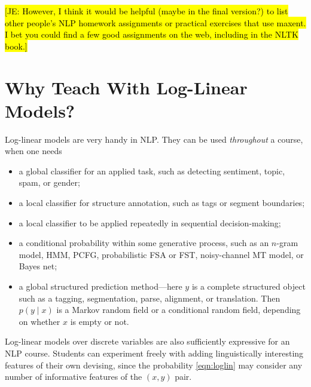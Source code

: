 \documentclass[11pt,letterpaper]{article}
\newcommand{\Note}[1]{}
\renewcommand{\Note}[1]{\hl{[#1]}}  %
\newcommand{\NoteSigned}[3]{{\sethlcolor{#2}\Note{#1: #3}}}
\newcommand{\NoteJE}[1]{\NoteSigned{JE}{LightGreen}{#1}}
\newcommand{\Commented}[1]{#1}
\begin{document}
\Commented{\NoteJE{However, I
  think it would be helpful (maybe in the final version?) to list
  other people's NLP homework assignments or practical exercises that
  use maxent.  I bet you could find a few good assignments on the web,
  including in the NLTK book.}}

\section{Why Teach With Log-Linear Models?}

Log-linear models are very handy in NLP.  They can be used {\em throughout} 
a course, when one needs 
\begin{itemize}
\item a global classifier for an applied task, such as detecting
  sentiment, topic, spam, or gender;
\item a local classifier for structure annotation,
  such as tags or segment boundaries;
\item a local classifier to be applied repeatedly in sequential decision-making;
\item a conditional probability within some generative process, such
  as an $n$-gram model, HMM, PCFG, probabilistic FSA or FST, noisy-channel MT model,
  or Bayes net;
\item a global structured prediction method---here $y$ is a complete
  structured object such as a tagging, segmentation, parse, alignment, or translation.  Then $p(y
  \mid x)$ is a Markov random field or a conditional random field,
  depending on whether $x$ is empty or not.
\end{itemize}  

Log-linear models over discrete variables are also sufficiently
expressive for an NLP course.  Students can experiment freely with
adding linguistically interesting features of their own devising,
since the probability \eqref{eqn:loglin} may consider any number of
informative features of the $(x,y)$ pair.
\end{document}
